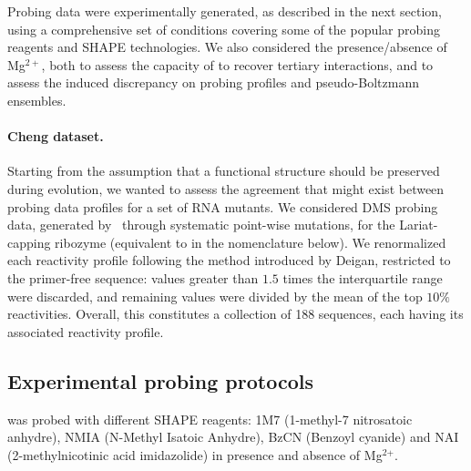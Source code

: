 \documentclass[a4,center,fleqn]{NAR}
\begin{document}
Probing data were experimentally generated, as described in the next section, using a comprehensive set of conditions covering some of the popular probing reagents and SHAPE technologies. 
We also considered the presence/absence of Mg$^{2+}$, both to assess the capacity of \OurTool{} to recover tertiary interactions, and to assess the induced discrepancy on probing profiles and pseudo-Boltzmann ensembles.


\paragraph{Cheng dataset.} 
Starting from the assumption that a functional structure should be preserved during evolution, we wanted to assess the agreement that might exist between probing data profiles for a set of RNA mutants. 
We considered DMS probing data, generated by~\cite{Cheng2017} through systematic point-wise mutations, for the Lariat-capping ribozyme (equivalent to  in the nomenclature below). We renormalized each reactivity profile following the method introduced by Deigan\etal\cite{Deigan2009}, restricted to the primer-free sequence: values greater than $1.5 $ times the interquartile range were discarded, and remaining values were divided by the mean of the top $10\%$ reactivities.  Overall, this constitutes a collection of 188 sequences, each having its associated reactivity profile.



\subsection*{Experimental probing protocols}



\didy{} was probed with different SHAPE reagents: 1M7 (1-methyl-7 nitrosatoic anhydre), NMIA (N-Methyl Isatoic Anhydre), BzCN (Benzoyl cyanide) and NAI (2-methylnicotinic acid imidazolide) in presence and absence of Mg$^\text{2+}$. 
\end{document}

